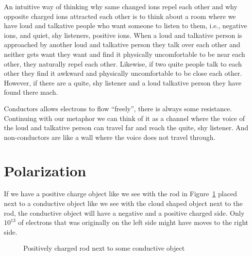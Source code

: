An intuitive way of thinking why same changed ions repel each other and why opposite charged ions attracted each other is to think about a room where we have loud and talkative people who want someone to listen to them, i.e., negative ions, and quiet, shy listeners, positive ions. When a loud and talkative person is approached by another loud and talkative person they talk over each other and neither gets want they want and find it physically uncomfortable to be near each other, they naturally repel each other. Likewise, if two quite people talk to each other they find it awkward and physically uncomfortable to be close each other. However, if there are a quite, shy listener and a loud talkative person they have found there mach.

Conductors allows electrons to flow ``freely'', there is always some resistance. Continuing with our metaphor we can think of it as a channel where the voice of the loud and talkative person can travel far and reach the quite, shy listener. And non-conductors are like a wall where the voice does not travel through.

\section{Polarization}

If we have a positive charge object like we see with the rod in Figure~\ref{fig:charged-rod} placed next to a conductive object like we see with the cloud shaped object next to the rod, the conductive object will have a negative and a positive charged side. Only $10^{13}$ of electrons that was originally on the left side might have moves to the right side.

\begin{figure}[H]
\centering
{}
  \caption{Positively charged rod next to some conductive object}
  \label{fig:charged-rod}
\end{figure}

